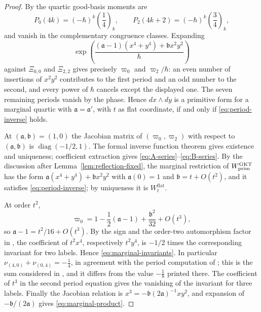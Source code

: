\begin{proof}
By \cite[Lem.~4.2 and (4.3)]{grossetal2022open} the quartic good-basis
moments are
\[
 P_0(4k)=(-\hbar)^k\left(\frac14\right)_k,
 \qquad
 P_2(4k+2)=(-\hbar)^k\left(\frac34\right)_k,
\]
and vanish in the complementary congruence classes.  Expanding
\[
 \exp\!\left(
  \frac{(\mathfrak a-1)(x^4+y^4)+\mathfrak b x^2y^2}{\hbar}
 \right)
\]
against $\Xi_{0,0}$ and $\Xi_{2,2}$ gives precisely $\varpi_0$ and
$\varpi_2/\hbar$: an even number of insertions of $x^2y^2$ contributes to the
first period and an odd number to the second, and every power of $\hbar$
cancels except the displayed one.  The seven remaining periods vanish by the
phase.  Hence $dx\wedge dy$ is a primitive form for a marginal quartic with
$\mathfrak a=\mathfrak a'$, with $t$ as flat coordinate, if and only if
\eqref{eq:period-inverse} holds.

At $(\mathfrak a,\mathfrak b)=(1,0)$ the Jacobian matrix of $(\varpi_0,\varpi_2)$ with
respect to $(\mathfrak a,\mathfrak b)$ is $\operatorname{diag}(-1/2,1)$.  The formal
inverse function theorem gives existence and uniqueness; coefficient
extraction gives \eqref{eq:A-series}--\eqref{eq:B-series}.  By the
discussion after Lemma~\ref{lem:reflection-fixed}, the marginal restriction
of $W^{\mathrm{GKT}}_{\mathrm{prim}}$ has the form $\mathfrak a(x^4+y^4)+\mathfrak b x^2y^2$ with
$\mathfrak a(0)=1$ and $\mathfrak b=t+O(t^2)$, and it satisfies
\eqref{eq:period-inverse}; by uniqueness it is $W^{\mathrm{flat}}_t$.

At order $t^2$,
\[
 \varpi_0=1-\frac12(\mathfrak a-1)+\frac{\mathfrak b^2}{32}+O(t^3),
\]
so $\mathfrak a-1=t^2/16+O(t^3)$.  By the sign and the order-two automorphism
factor in \cite[(4.11)]{grossetal2022open}, the coefficient of $t^2x^4$,
respectively $t^2y^4$, is $-1/2$ times the corresponding invariant for two
labels.  Hence \eqref{eq:marginal-invariants}.  In particular
$\nu_{(4,0)}+\nu_{(0,4)}=-\frac14$, in agreement with the period
computation of \cite[Rem.~4.3]{wuebben2026boundary}; this is the sum
considered in \cite[Ex.~5.5]{grossetal2026survey}, and it differs from the
value $-\frac18$ printed there.  The coefficient of $t^3$
in the second period equation gives the vanishing of the invariant for three
labels.  Finally the Jacobian relation is $x^3=-\mathfrak b(2\mathfrak a)^{-1}xy^2$, and expansion
of $-\mathfrak b/(2\mathfrak a)$ gives \eqref{eq:marginal-product}.
\end{proof}

